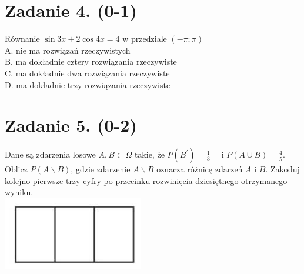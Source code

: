 \documentclass[10pt]{article}
\begin{document}
\section*{Zadanie 4. (0-1)}
Równanie \(\sin 3 x+2 \cos 4 x=4\) w przedziale \((-\pi ; \pi)\)\\
A. nie ma rozwiązań rzeczywistych\\
B. ma dokładnie cztery rozwiązania rzeczywiste\\
C. ma dokładnie dwa rozwiązania rzeczywiste\\
D. ma dokładnie trzy rozwiązania rzeczywiste

\section*{Zadanie 5. (0-2)}
Dane są zdarzenia losowe \(A, B \subset \Omega\) takie, że \(P\left(B^{\prime}\right)=\frac{1}{3} \quad\) i \(P(A \cup B)=\frac{4}{5}\). Oblicz \(P(A \backslash B)\), gdzie zdarzenie \(A \backslash B\) oznacza różnicę zdarzeń \(A\) i \(B\). Zakoduj kolejno pierwsze trzy cyfry po przecinku rozwinięcia dziesiętnego otrzymanego wyniku.\\
\includegraphics[max width=\textwidth, center]{2024_11_21_49bfa1d51da2e7fce9c5g-02}
\end{document}
